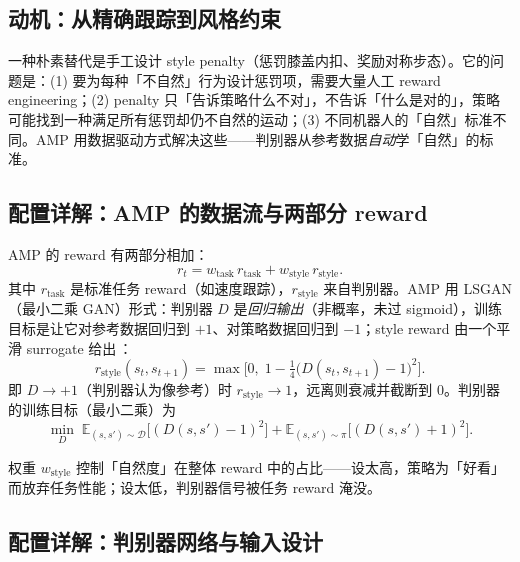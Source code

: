 \subsection{动机：从精确跟踪到风格约束}
\label{sec:rlmc-imit-amp-motivation}

一种朴素替代是手工设计 style penalty（惩罚膝盖内扣、奖励对称步态）。它的问题是：(1) 要为每种「不自然」行为设计惩罚项，需要大量人工 reward engineering；(2) penalty 只「告诉策略什么不对」，不告诉「什么是对的」，策略可能找到一种满足所有惩罚却仍不自然的运动；(3) 不同机器人的「自然」标准不同。AMP 用数据驱动方式解决这些——判别器从参考数据\emph{自动}学「自然」的标准。

\subsection{配置详解：AMP 的数据流与两部分 reward}
\label{sec:rlmc-imit-amp-dataflow}

AMP 的 reward 有两部分相加：
\begin{equation}
r_t = w_{\text{task}}\, r_{\text{task}} + w_{\text{style}}\, r_{\text{style}}.
\label{eq:rlmc-imit-amp-reward}
\end{equation}
其中 $r_{\text{task}}$ 是标准任务 reward（如速度跟踪），$r_{\text{style}}$ 来自判别器。AMP 用 LSGAN（最小二乘 GAN）形式：判别器 $D$ 是\emph{回归输出}（非概率，未过 sigmoid），训练目标是让它对参考数据回归到 $+1$、对策略数据回归到 $-1$；style reward 由一个平滑 surrogate 给出\,\cite{peng2021amp}：
\begin{equation}
r_{\text{style}}(s_t,s_{t+1}) = \max\!\Big[0,\; 1 - \tfrac14\big(D(s_t,s_{t+1}) - 1\big)^2\Big].
\label{eq:rlmc-imit-amp-style}
\end{equation}
即 $D\to+1$（判别器认为像参考）时 $r_{\text{style}}\to1$，远离则衰减并截断到 0。判别器的训练目标（最小二乘）为
\begin{equation}
\min_{D}\; \mathbb{E}_{(s,s')\sim\mathcal{D}}\big[(D(s,s')-1)^2\big] + \mathbb{E}_{(s,s')\sim\pi}\big[(D(s,s')+1)^2\big].
\label{eq:rlmc-imit-amp-disc}
\end{equation}

权重 $w_{\text{style}}$ 控制「自然度」在整体 reward 中的占比——设太高，策略为「好看」而放弃任务性能；设太低，判别器信号被任务 reward 淹没。

\subsection{配置详解：判别器网络与输入设计}
\label{sec:rlmc-imit-amp-net}

